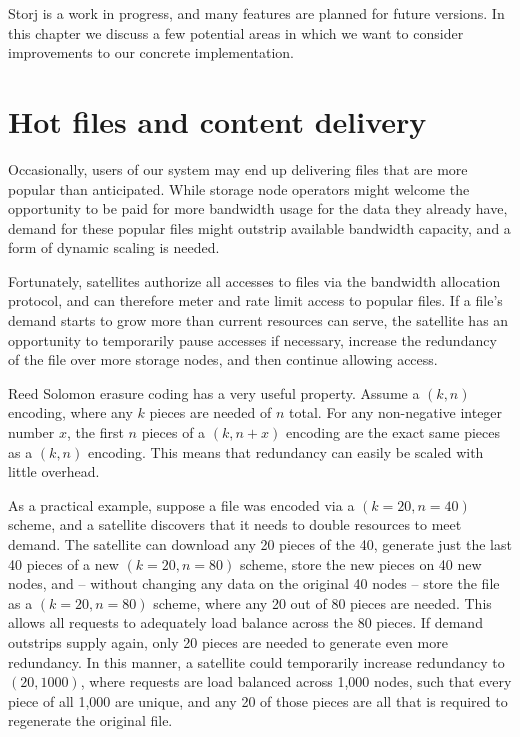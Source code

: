 \documentclass[11pt,fleqn,openany]{book}
\begin{document}
Storj is a work in progress, and many features are planned for future
versions. In this chapter we discuss a few potential areas in which we want to
consider improvements to our concrete implementation.

\section{Hot files and content delivery}\label{sec:future-hot-files}

Occasionally, users of our system may end up delivering files that are more
popular than anticipated. While storage node operators might welcome the
opportunity to be paid for more bandwidth usage for the data they already have,
demand for these popular files might outstrip available bandwidth capacity,
and a form of dynamic scaling is needed.

Fortunately, satellites authorize all accesses to files via the bandwidth
allocation protocol, and can therefore meter and rate limit access to popular
files. If a file's demand starts to grow more than current resources can serve,
the satellite has an opportunity to temporarily pause accesses if necessary,
increase the redundancy of the file over more storage nodes, and then continue
allowing access.

Reed Solomon erasure coding has a very useful property. Assume a $(k, n)$
encoding, where any $k$ pieces are needed of $n$ total. For any non-negative
integer number $x$, the first $n$ pieces of a $(k, n+x)$ encoding are the exact
same pieces as a $(k, n)$ encoding. This means that redundancy can easily be
scaled with little overhead.

As a practical example, suppose a file was encoded via a $(k=20, n=40)$ scheme,
and a satellite discovers that it needs to double resources to meet demand.
The satellite can download any 20 pieces of the 40, generate just the last 40
pieces of a new $(k=20, n=80)$ scheme, store the new pieces on 40 new nodes,
and -- without changing any data on the original 40 nodes -- store the file 
as a $(k=20, n=80)$ scheme, where any 20 out of 80 pieces are needed.
This allows all requests to adequately load balance across the 80 pieces.
If demand outstrips supply again, only 20 pieces are needed to generate even
more redundancy. In this manner, a satellite could temporarily increase
redundancy to $(20, 1000)$, where requests are load balanced across 1,000 nodes,
such that every piece of all 1,000 are unique, and any 20 of those pieces are
all that is required to regenerate the original file.
\end{document}
